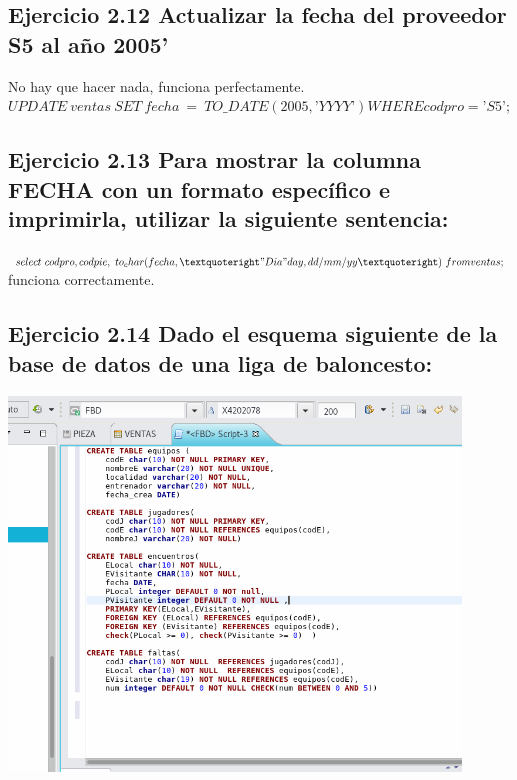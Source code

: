 \documentclass[a4paper, 11pt]{article}
\begin{document}
\subsection{Ejercicio 2.12 Actualizar la fecha del proveedor S5 al año 2005’}
No hay que hacer nada, funciona perfectamente.
$UPDATE\ ventas\
SET\ fecha\ =\ TO\_DATE(2005,’YYYY’)
WHERE codpro=’S5’;$

\subsection{Ejercicio 2.13 Para mostrar la columna FECHA con un formato específico e imprimirla, utilizar la siguiente sentencia:}
$select\ codpro,codpie,\ to_char(fecha,’"Dia" day,dd/mm/yy’)\ from ventas;$ funciona correctamente.

\subsection{Ejercicio 2.14 Dado el esquema siguiente de la base de datos de una liga de baloncesto:}
  \centering \includegraphics[width=0.9\textwidth]{1.png}
\end{document}
